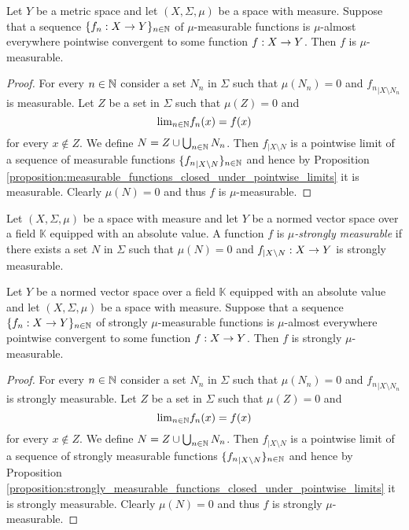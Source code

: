 \begin{corollary}\label{corollary:mu_measurable_closed_under_almost_everywhere_convergence}
Let $Y$ be a metric space and let $(X,\Sigma,\mu)$ be a space with measure. Suppose that a sequence $\{f_n:X\rightarrow Y\}_{n\in {\mathbb N}}$ of $\mu$-measurable functions is $\mu$-almost everywhere pointwise convergent to some function $f:X\rightarrow Y$. Then $f$ is $\mu$-measurable.
\end{corollary}
\begin{proof}
For every $n\in {\mathbb N}$ consider a set $N_n$ in $\Sigma$ such that $\mu(N_n) = 0$ and ${f_n}_{\mid X\setminus N_n}$ is measurable. Let $Z$ be a set in $\Sigma$ such that $\mu(Z) = 0$ and 
$$\mathrm{lim}_{n\in {\mathbb N}}f_n(x) = f(x)$$
for every $x\not \in Z$. We define $N = Z\cup \bigcup_{n\in {\mathbb N}}N_n$. Then $f_{\mid X\setminus N}$ is a pointwise limit of a sequence of measurable functions $\{{f_n}_{\mid X\setminus N}\}_{n\in {\mathbb N}}$ and hence by Proposition \ref{proposition:measurable_functions_closed_under_pointwise_limits} it is measurable. Clearly $\mu(N) = 0$ and thus $f$ is $\mu$-measurable.
\end{proof}

\begin{definition}
Let $(X,\Sigma,\mu)$ be a space with measure and let $Y$ be a normed vector space over a field $\mathbb{K}$ equipped with an absolute value. A function $f$ is \textit{$\mu$-strongly measurable} if there exists a set $N$ in $\Sigma$ such that $\mu(N) = 0$ and $f_{\mid X\setminus N}:X\rightarrow Y$ is strongly measurable.
\end{definition}

\begin{corollary}\label{corollary:mu_strongly_measurable_closed_under_almost_everywhere_convergence}
Let $Y$ be a normed vector space over a field $\mathbb{K}$ equipped with an absolute value and let $(X,\Sigma,\mu)$ be a space with measure. Suppose that a sequence $\{f_n:X\rightarrow Y\}_{n\in {\mathbb N}}$ of strongly $\mu$-measurable functions is $\mu$-almost everywhere pointwise convergent to some function $f:X\rightarrow Y$. Then $f$ is strongly $\mu$-measurable.
\end{corollary}
\begin{proof}
For every $n\in {\mathbb N}$ consider a set $N_n$ in $\Sigma$ such that $\mu(N_n) = 0$ and ${f_n}_{\mid X\setminus N_n}$ is strongly measurable. Let $Z$ be a set in $\Sigma$ such that $\mu(Z) = 0$ and 
$$\mathrm{lim}_{n\in {\mathbb N}}f_n(x) = f(x)$$
for every $x\not \in Z$. We define $N = Z\cup \bigcup_{n\in {\mathbb N}}N_n$. Then $f_{\mid X\setminus N}$ is a pointwise limit of a sequence of strongly measurable functions $\{{f_n}_{\mid X\setminus N}\}_{n\in {\mathbb N}}$ and hence by Proposition \ref{proposition:strongly_measurable_functions_closed_under_pointwise_limits} it is strongly measurable. Clearly $\mu(N) = 0$ and thus $f$ is strongly $\mu$-measurable.
\end{proof}

